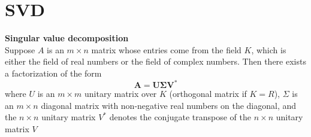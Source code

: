 \documentclass{book}
\begin{document}
\chapter{SVD}
\begin{theorem}
\textbf{Singular value decomposition}\\
Suppose $A$ is an $m \times n$ matrix whose entries come from the field $K$, which is either the field of real numbers or the field of complex numbers.
Then there exists a factorization of the form
$$
\mathbf{A} = \mathbf{U} \boldsymbol{\Sigma} \mathbf{V}^*
$$
where $U$ is an $m \times m$ unitary matrix over $K$ (orthogonal matrix if $K = R$),
$Σ$ is an $m \times n$ diagonal matrix with non-negative real numbers on the diagonal,
and the $n \times n$ unitary matrix $V^*$ denotes the conjugate transpose of the $n \times n$ unitary matrix $V$
\end{theorem}
\end{document}
